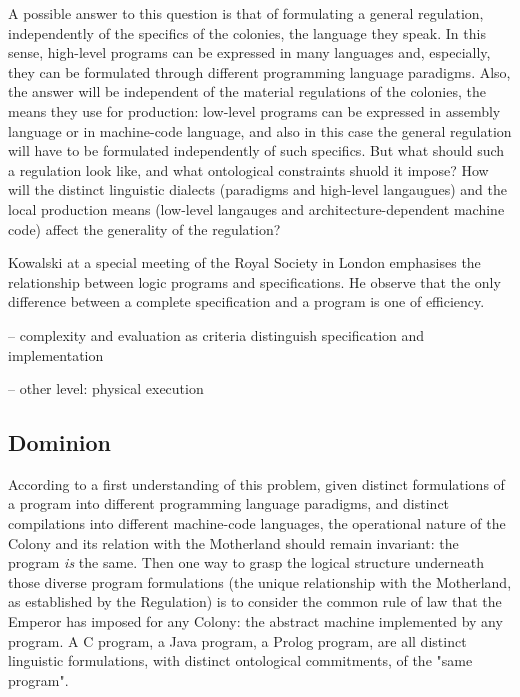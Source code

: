 \documentclass[]{article}
\begin{document}
A possible answer to this question is that of formulating a general regulation, independently of the specifics of the colonies, the language they speak. In this sense, high-level programs can be expressed in many languages and, especially, they can be formulated through different programming language paradigms. Also, the answer will be independent of the material regulations of the colonies, the means they use for production: low-level programs can be expressed in assembly language or in machine-code language, and also in this case the general regulation will have to be formulated independently of such specifics. But what should such a regulation look like, and what ontological constraints shuold it impose? How will the distinct linguistic dialects (paradigms and high-level langaugues) and the local production means (low-level langauges and architecture-dependent machine code) affect the generality of the regulation?


{\color{red}{Ray (links down to Magna Carta)}}


Kowalski at a special meeting of the Royal Society in London emphasises
the relationship between logic programs and specifications. He observe that
the only difference between a complete specification and a program is one of
efficiency.


-- complexity and evaluation as criteria distinguish specification and implementation

-- other level: physical execution


\subsection{Dominion}


{\color{red}{this passage is inspired by Nicola's note}}

According to a first understanding of this problem, given distinct formulations of a program into different programming language paradigms, and distinct compilations into different machine-code languages, the operational nature of the Colony and its relation with the Motherland should remain invariant: the program \textit{is} the same.  Then one way to grasp the logical structure underneath those diverse program formulations (the unique relationship with the Motherland, as established by the Regulation) is to consider the common rule of law that the Emperor has imposed for any Colony: the abstract machine implemented by any program. A C program, a Java program, a Prolog program, are all distinct linguistic formulations, with distinct ontological commitments, of the "same program".
\end{document}
